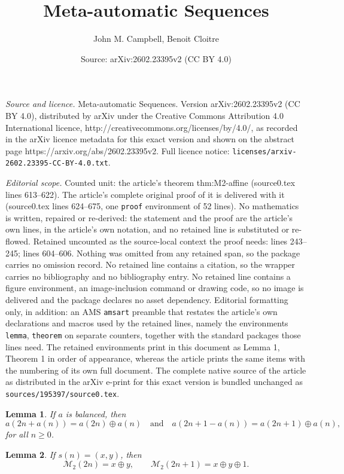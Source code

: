 \documentclass[10pt,a4paper]{amsart}
\title{Meta-automatic Sequences}
\author{John M. Campbell, Benoit Cloitre}
\date{Source: arXiv:2602.23395v2 (CC BY 4.0)}
\newtheorem{lemma}{Lemma}
\begin{document}
\maketitle

\noindent\emph{Source and licence.} Meta-automatic Sequences. Version arXiv:2602.23395v2 (CC BY 4.0), distributed by arXiv under the Creative Commons Attribution 4.0 International licence, http://creativecommons.org/licenses/by/4.0/, as recorded in the arXiv licence metadata for this exact version and shown on the abstract page https://arxiv.org/abs/2602.23395v2. Full licence notice: \texttt{licenses/arxiv-2602.23395-CC-BY-4.0.txt}.\par\smallskip

\noindent\textit{Editorial scope.} Counted unit: the article's theorem thm:M2-affine (source0.tex lines 613--622). The article's complete original proof of it is delivered with it (source0.tex lines 624--675, one \texttt{proof} environment of 52 lines). No mathematics is written, repaired or re-derived: the statement and the proof are the article's own lines, in the article's own notation, and no retained line is substituted or re-flowed.  Retained uncounted as the source-local context the proof needs: lines 243--245; lines 604--606.  Nothing was omitted from any retained span, so the package carries no omission record.  No retained line contains a citation, so the wrapper carries no bibliography and no bibliography entry.  No retained line contains a figure environment, an image-inclusion command or drawing code, so no image is delivered and the package declares no asset dependency.  Editorial formatting only, in addition: an AMS \texttt{amsart} preamble that restates the article's own declarations and macros used by the retained lines, namely the environments \texttt{lemma}, \texttt{theorem} on separate counters, together with the standard packages those lines need.  The retained environments print in this document as Lemma 1, Theorem 1 in order of appearance, whereas the article prints the same items with the numbering of its own full document.  The complete native source of the article as distributed in the arXiv e-print for this exact version is bundled unchanged as \texttt{sources/195397/source0.tex}.
\begin{lemma}\label{lem:balance-xor} 
 If $a$ is balanced, then $$ a(2n+a(n)) = a(2n)\oplus a(n) \quad\text{and}\quad a(2n+1-a(n)) = a(2n+1)\oplus a(n), $$ for all $n\ge 0$. 
\end{lemma}

\begin{lemma}\label{lem:M2-recover} 
 If $s(n)=(x,y)$, then $$\mathcal{M}_{2}(2 n) = x\oplus y, \qquad \mathcal{M}_{2}(2n+1)=x\oplus y\oplus 1.$$
\end{lemma}
\end{document}
